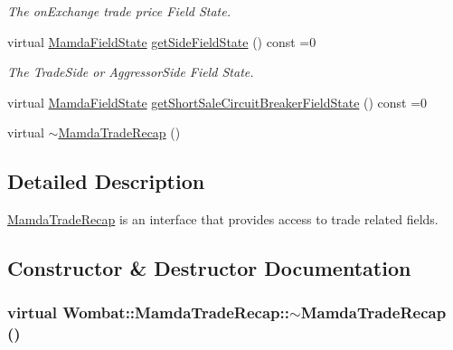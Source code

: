 \begin{CompactItemize}
\begin{CompactList}\small\item\em The on\-Exchange trade price Field State. \item\end{CompactList}\item 
virtual \hyperlink{namespaceWombat_93aac974f2ab713554fd12a1fa3b7d2a}{Mamda\-Field\-State} \hyperlink{classWombat_1_1MamdaTradeRecap_69f58e9304fcfeedd22b8e9067c6b47a}{get\-Side\-Field\-State} () const =0
\begin{CompactList}\small\item\em The Trade\-Side or Aggressor\-Side Field State. \item\end{CompactList}\item 
virtual \hyperlink{namespaceWombat_93aac974f2ab713554fd12a1fa3b7d2a}{Mamda\-Field\-State} \hyperlink{classWombat_1_1MamdaTradeRecap_6808f080463130d2426dad0cc2ba9c16}{get\-Short\-Sale\-Circuit\-Breaker\-Field\-State} () const =0
\item 
virtual \hyperlink{classWombat_1_1MamdaTradeRecap_391a37196e643307b660fb486191c219}{$\sim$Mamda\-Trade\-Recap} ()
\end{CompactItemize}


\subsection{Detailed Description}
\hyperlink{classWombat_1_1MamdaTradeRecap}{Mamda\-Trade\-Recap} is an interface that provides access to trade related fields. 



\subsection{Constructor \& Destructor Documentation}
\hypertarget{classWombat_1_1MamdaTradeRecap_391a37196e643307b660fb486191c219}{
\subsubsection[$\sim$MamdaTradeRecap]{\setlength{\rightskip}{0pt plus 5cm}virtual Wombat::Mamda\-Trade\-Recap::$\sim$Mamda\-Trade\-Recap ()}}
\label{classWombat_1_1MamdaTradeRecap_391a37196e643307b660fb486191c219}




